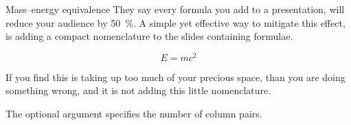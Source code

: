 \begin{frame}{Mass--energy equivalence}
	They say every formula you add to a presentation, will reduce your audience by \SI{50}{\percent}. A simple yet effective way to mitigate this effect, is adding a compact nomenclature to the slides containing formulae.
	
	\[E=mc^2\]
	
	If you find this is taking up too much of your precious space, than you are doing something wrong, and it is not adding this little nomenclature.
	
	The optional argument specifies the number of column pairs.
	
\end{frame}